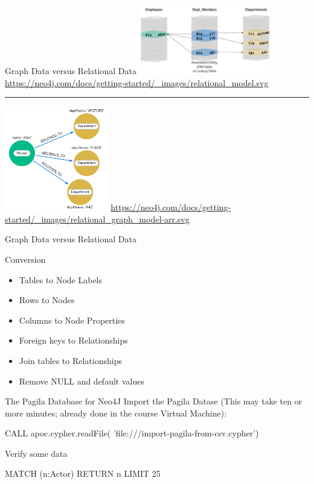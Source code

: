 \documentclass[ignorenonframetext,xcolor=x11names]{beamer}
\begin{document}
\begin{frame}{Graph Data versus Relational Data}
\centering
\includegraphics[height=1.2in]{screen9.png}
\tiny{\url{https://neo4j.com/docs/getting-started/_images/relational_model.svg}} \hrule
\includegraphics[height=1.8in]{screen10.png}
\tiny{\url{https://neo4j.com/docs/getting-started/_images/relational_graph_model-arr.svg}}
\end{frame}

\begin{frame}{Graph Data versus Relational Data}
\begin{block}{Conversion}
\begin{itemize}
  \item Tables to Node Labels
  \item Rows to Nodes
  \item Columns to Node Properties
  \item Foreign keys to Relationships
  \item Join tables to Relationships
  \item Remove NULL and default values
\end{itemize}
\end{block}
\end{frame}

\begin{frame}[fragile]{The Pagila Database for Neo4J}
Import the Pagila Datase (This may take ten or more minutes; already done in the course Virtual Machine):
\small
\begin{cyphercode}
CALL apoc.cypher.readFile(
       'file:///import-pagila-from-csv.cypher')
\end{cyphercode}
\normalsize
Verify some data
\small
\begin{cyphercode}
MATCH (n:Actor) RETURN n LIMIT 25
\end{cyphercode}
\end{frame}
\end{document}
